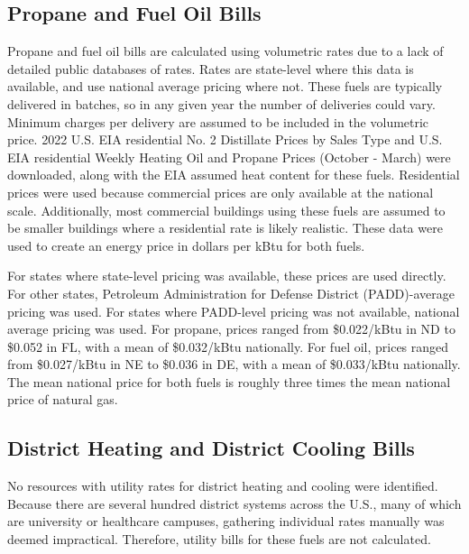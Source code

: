 \subsection{Propane and Fuel Oil Bills}
Propane and fuel oil bills are calculated using volumetric rates due to a lack of detailed public databases of rates. Rates are state-level where this data is available, and use national average pricing where not. These fuels are typically delivered in batches, so in any given year the number of deliveries could vary. Minimum charges per delivery are assumed to be included in the volumetric price. 2022 U.S. EIA residential No. 2 Distillate Prices by Sales Type and U.S. EIA residential Weekly Heating Oil and Propane Prices (October - March) \citep{eia_fuel_oil_and_propane} were downloaded, along with the EIA assumed heat content for these fuels. Residential prices were used because commercial prices are only available at the national scale. Additionally, most commercial buildings using these fuels are assumed to be smaller buildings where a residential rate is likely realistic. These data were used to create an energy price in dollars per kBtu for both fuels.

For states where state-level pricing was available, these prices are used directly. For other states, Petroleum Administration for Defense District (PADD)-average pricing was used. For states where PADD-level pricing was not available, national average pricing was used. For propane, prices ranged from \$0.022/kBtu in ND to \$0.052 in FL, with a mean of \$0.032/kBtu nationally. For fuel oil, prices ranged from \$0.027/kBtu in NE to \$0.036 in DE, with a mean of \$0.033/kBtu nationally. The mean national price for both fuels is roughly three times the mean national price of natural gas.

\subsection{District Heating and District Cooling Bills}
No resources with utility rates for district heating and cooling were identified. Because there are several hundred district systems across the U.S., many of which are university or healthcare campuses, gathering individual rates manually was deemed impractical. Therefore, utility bills for these fuels are not calculated.
